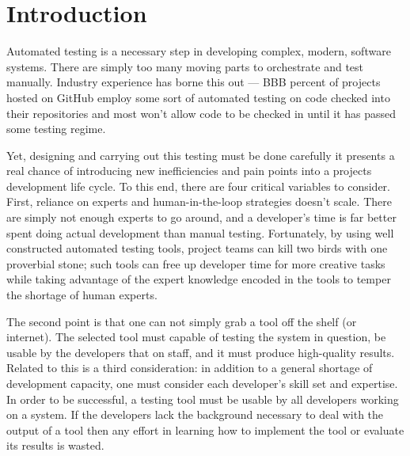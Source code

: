 \section{Introduction}
\label{SEC:introduction}





 Automated testing
is a necessary step in developing complex, modern, software systems.  There
are simply too many moving parts to orchestrate and test manually.
Industry experience has borne this out --- BBB percent of projects hosted
on GitHub employ some sort of automated testing on code checked into their
repositories and most won't allow code to be checked in until it has passed
some testing regime.

Yet, designing and carrying out this testing must be done carefully it
presents a real chance of introducing new inefficiencies and pain points
into a projects development life cycle.  To this end, there are four
critical variables to consider.  First, reliance on experts and
human-in-the-loop strategies doesn't scale.  There are
simply not enough experts to go around, and a developer's time is far
better spent doing actual development than manual testing.  Fortunately, by using well constructed automated
testing tools, project teams can kill two birds with one proverbial stone;
such tools can free up developer time for more creative tasks while taking
advantage of the expert knowledge encoded in the tools to temper the
shortage of human experts.


The second point is that one can not simply grab a tool off the shelf (or
internet).  The selected tool must capable of testing the system in
question, be usable by the developers that on staff, and it must produce
high-quality results.  Related to this is a third consideration: in
addition to a general shortage of development capacity, one must consider
each developer’s skill set and expertise. In order to be successful, a
testing tool must be usable by all developers working on a system. If the
developers lack the background necessary to deal with the output of a tool
then any effort in learning how to implement the tool or  evaluate its
results is wasted.

